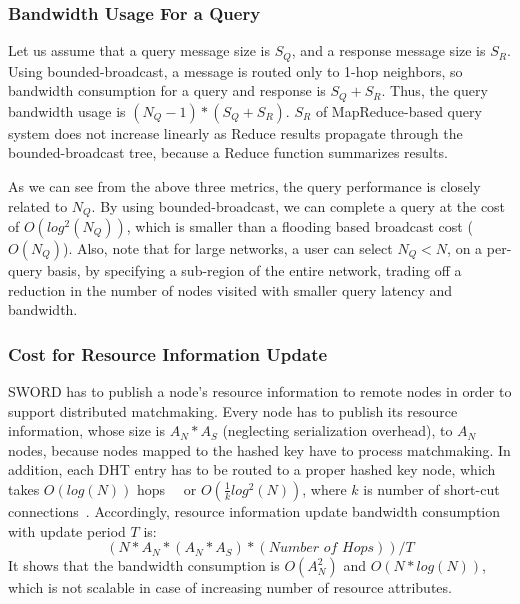 \documentclass{acm_proc_article-sp}
\begin{document}
\subsubsection{Bandwidth Usage For a Query}
Let us assume that a query message size is $S_Q$, and a response message size is $S_R$.
Using bounded-broadcast, a message is routed only to 1-hop neighbors, so bandwidth consumption for a query and response is $S_Q+S_R$.
Thus, the query bandwidth usage is \begin{math}(N_Q-1)*(S_Q+S_R)\end{math}.
$S_R$ of MapReduce-based query system does not increase linearly as Reduce results propagate through the bounded-broadcast tree, because a Reduce function summarizes results.

As we can see from the above three metrics, the query performance is closely related to $N_Q$. By using bounded-broadcast, we can complete a query
at the cost of \begin{math}O(log^2(N_Q))\end{math}, which is smaller than a flooding based broadcast cost (\begin{math}O(N_Q)\end{math}). Also, note that for large networks, a user can select $N_Q < N$, on a per-query basis, by specifying a sub-region of the entire network, trading off a reduction in the number of nodes visited with smaller query latency and bandwidth.
\subsubsection{Cost for Resource Information Update}
SWORD has to publish a node's resource information to remote nodes in order to support distributed matchmaking.
Every node has to publish its resource information, whose size is $A_N*A_S$ (neglecting serialization overhead), to $A_N$ nodes, because nodes mapped to the hashed key have to process matchmaking. 
In addition, each DHT entry has to be routed to a proper hashed key node, which takes $O(log(N))$ hops~\cite{chord}~\cite{pastry} or \begin{math}O(\frac{1}{k}log^2(N))\end{math}, where $k$ is number of short-cut connections~\cite{brunet}.
Accordingly, resource information update bandwidth consumption with update period $T$ is:
\begin{displaymath}(N*A_N*(A_N*A_S)*(\textit{Number of Hops}))/T\end{displaymath}
It shows that the bandwidth consumption is $O(A_N^2)$ and $O(N*log(N))$, which is not scalable in case of increasing number of resource attributes.
\end{document}
